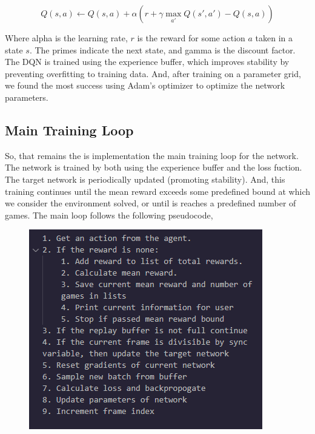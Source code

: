 \documentclass[12pt, a4paper, twocolumn]{article} %
\begin{document}
\[  Q(s,a) \leftarrow Q(s,a) + \alpha (r + \gamma \max_{a'} Q(s',a') - Q(s,a))  \]

Where alpha is the learning rate, $r$ is the reward for some action $a$ taken in a state $s$. The primes indicate the next state, and gamma is the discount factor. The DQN is trained using the experience buffer, which improves stability by preventing overfitting to training data. And, after training on a parameter grid, we found the most success using Adam's optimizer to optimize the network parameters. 

\subsection{Main Training Loop}

So, that remains the is implementation the main training loop for the network. The network is trained by both using the experience buffer and the loss fuction. The target network is periodically updated (promoting stability). And, this training continues until the mean reward exceeds some predefined bound at which we consider the environment solved, or until is reaches a predefined number of games. The main loop follows the following pseudocode,

\begin{figure}[H]
	\includegraphics[width=\linewidth]{traing_loop_pseudocode.PNG} %
\end{figure}


\end{document}
